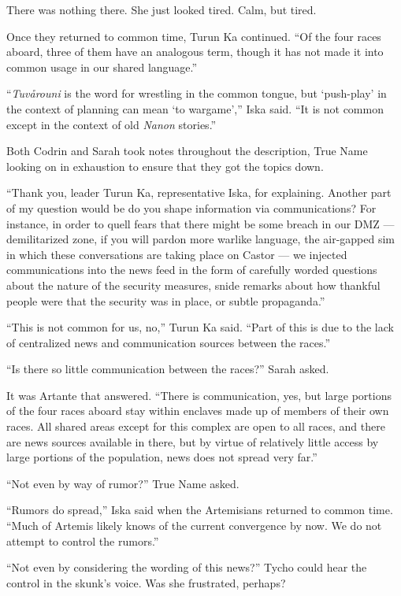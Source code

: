There was nothing there. She just looked tired. Calm, but tired.

Once they returned to common time, Turun Ka continued. ``Of the four races aboard, three of them have an analogous term, though it has not made it into common usage in our shared language.''

``\emph{Tuvårouni} is the word for wrestling in the common tongue, but `push-play' in the context of planning can mean `to wargame','' Iska said. ``It is not common except in the context of old \emph{Nanon} stories.''

Both Codrin and Sarah took notes throughout the description, True Name looking on in exhaustion to ensure that they got the topics down.

``Thank you, leader Turun Ka, representative Iska, for explaining. Another part of my question would be do you shape information via communications? For instance, in order to quell fears that there might be some breach in our DMZ — demilitarized zone, if you will pardon more warlike language, the air-gapped sim in which these conversations are taking place on Castor — we injected communications into the news feed in the form of carefully worded questions about the nature of the security measures, snide remarks about how thankful people were that the security was in place, or subtle propaganda.''

``This is not common for us, no,'' Turun Ka said. ``Part of this is due to the lack of centralized news and communication sources between the races.''

``Is there so little communication between the races?'' Sarah asked.

It was Artante that answered. ``There is communication, yes, but large portions of the four races aboard stay within enclaves made up of members of their own races. All shared areas except for this complex are open to all races, and there are news sources available in there, but by virtue of relatively little access by large portions of the population, news does not spread very far.''

``Not even by way of rumor?'' True Name asked.

``Rumors do spread,'' Iska said when the Artemisians returned to common time. ``Much of Artemis likely knows of the current convergence by now. We do not attempt to control the rumors.''

``Not even by considering the wording of this news?'' Tycho could hear the control in the skunk's voice. Was she frustrated, perhaps?

